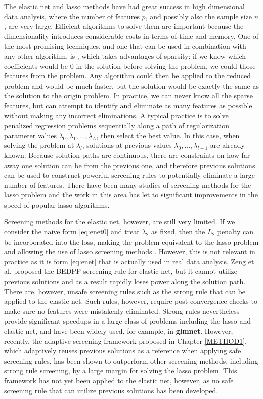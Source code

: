 The elastic net and lasso methods have had great success in high dimensional data analysis, where the number of features $p$, and possibly also the sample size $n$, are very large. Efficient algorithms to solve them are important because the dimensionality introduces considerable costs in terms of time and memory. One of the most promising techniques, and one that can be used in combination with any other algorithm, is , which takes advantages of sparsity: if we knew which coefficients would be 0 in the solution before solving the problem, we could  those features from the problem. Any algorithm could then be applied to the reduced problem and would be much faster, but the solution would be exactly the same as the solution to the origin problem. In practice, we can never know all the sparse features, but can attempt to identify and eliminate as many features as possible without making any incorrect eliminations. A typical practice is to solve penalized regression problems sequentially along a path of regularization parameter values $\lambda_0,\lambda_1,...,\lambda_L$, then select the best value. In this case, when solving the problem at $\lambda_l$, solutions at previous values $\lambda_0,...,\lambda_{l-1}$ are already known. Because solution paths are continuous, there are constraints on how far away one solution can be from the previous one, and therefore previous solutions can be used to construct powerful screening rules to potentially eliminate a large number of features. There have been many studies of screening methods for the lasso problem \citep{ghaoui2010safe,Tibshirani2012,wang2013lasso,fercoq2015,Zeng2021} and the work in this area has let to significant improvements in the speed of popular lasso algorithms.

Screening methods for the elastic net, however, are still very limited. If we consider the naive form \eqref{eq:enet0} and treat $\lambda_2$ as fixed, then the $L_2$ penalty can be incorporated into the loss, making the problem equivalent to the lasso problem and allowing the use of lasso screening methods \citep{xu2019}. However, this is not relevant in practice as it is form \eqref{eq:enet} that is actually used in real data analysis. Zeng et al. \citep{Zeng2021} proposed the BEDPP screening rule for elastic net, but it cannot utilize previous solutions and as a result rapidly loses power along the solution path. There are, however, unsafe screening rules such as the strong rule \citep{Tibshirani2012} that can be applied to the elastic net. Such rules, however, require post-convergence checks to make sure no features were mistakenly eliminated. Strong rules nevertheless provide significant speedups in a large class of problems including the lasso and elastic net, and have been widely used, for example, in \textbf{glmnet}. However, recently, the adaptive screening framework proposed in Chapter \ref{METHOD1}, which adaptively reuses previous solutions as a reference when applying safe screening rules, has been shown to outperform other screening methods, including strong rule screening, by a large margin for solving the lasso problem. This framework has not yet been applied to the elastic net, however, as no safe screening rule that can utilize previous solutions has been developed.


